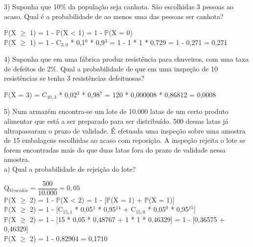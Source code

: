\documentclass[12pt,a4paper]{article}
\begin{document}
	\vspace{1cm}
	3) Suponha que 10\% da população seja canhota. São escolhidas 3 pessoas ao acaso. Qual é a probabilidade de ao menos uma das pessoas ser canhota?
	\begin{center}
		\vspace{0.5cm}
		$\mathbb{P}$(X $\geq$ 1) = 1 - $\mathbb{P}$(X < 1) = 1 - $\mathbb{P}$(X = 0)
		\vspace{0.25cm}\\
		$\mathbb{P}$(X $\geq$ 1) = 1 - C$_{3, 0}$ * 0,1$^0$ * 0,9$^3$ = 1 - 1 * 1 * 0,729 = 1 - 0,271 = 0,271 
	\end{center}
	\vspace{1cm}
	4) Suponha que em uma fábrica produz resistência para chuveiros, com uma taxa de	defeitos de 2\%. Qual a probabilidade de que em uma inspeção de 10 resistências se tenha 3 resistências defeituosas?
	\begin{center}
		\vspace{0.5cm}
		$\mathbb{P}$(X = 3) = C$_{10, 3}$ * 0,02$^3$ * 0,98$^7$ = 120 * 0,000008 * 0,86812 = 0,0008
	\end{center}
	\vspace{1cm}
	5) Num armazém encontra-se um lote de 10.000 latas de um certo produto alimentar que está a ser preparado para ser distribuído. 500 dessas latas já ultrapassaram o prazo de validade. É efetuada uma inspeção sobre uma amostra de 15 embalagens escolhidas ao acaso com reposição. A inspeção rejeita o lote se forem encontradas mais do que duas
	latas fora do prazo de validade nessa amostra.\\ 
	a) Qual a probabilidade de rejeição do lote?
	\begin{center}
		\vspace{0.5cm}
		Q$_{Vencidos} = \dfrac{500}{10.000} = 0,05$
		\vspace{0.75cm}\\
		$\mathbb{P}$(X $\geq$ 2) = 1 - $\mathbb{P}$(X < 2) = 1 - [$\mathbb{P}$(X = 1) + $\mathbb{P}$(X = 1)]
		\vspace{0.25cm}\\
		$\mathbb{P}$(X $\geq$ 2) = 1 - [C$_{15, 1}$ * 0,05$^1$ * 0,95$^14$ + C$_{15, 0}$ * 0,05$^0$ * 0,95$^15$]
		\vspace{0.25cm}\\
		$\mathbb{P}$(X $\geq$ 2) = 1 - [15 * 0,05 * 0,48767 + 1 * 1 * 0,46329] = 1 - [0,36575 + 0,46329]
		\vspace{0.25cm}\\
		$\mathbb{P}$(X $\geq$ 2) = 1 - 0,82904 = 0,1710
	\end{center}
\end{document}
